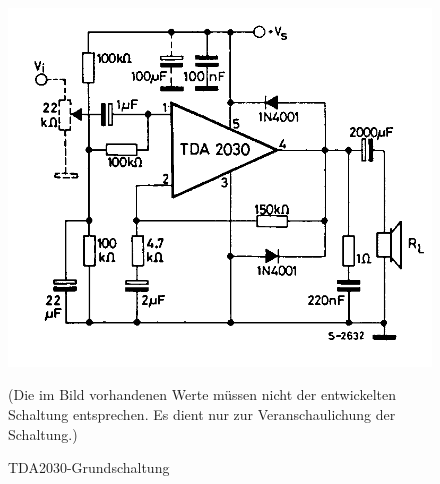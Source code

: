 \begin{figure} [H]
	\centering
	\includegraphics[width=1\textwidth]{img/Grundlagen/TDA2030/TDA2030-Grundschaltung.png}
	\caption[TDA2030-Grundschaltung]{TDA2030-Grundschaltung\footnotemark}
	\text (Die im Bild vorhandenen Werte müssen nicht der entwickelten Schaltung entsprechen. Es dient nur zur Veranschaulichung der Schaltung.)
	\label {fig:8.3.2.1}
\end{figure}

\newpage
